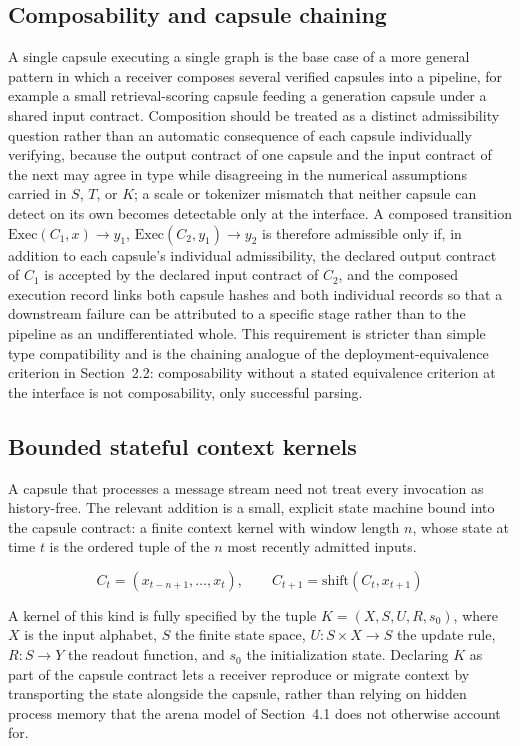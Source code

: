 \documentclass[11pt]{article}
\begin{document}
\subsection{Composability and capsule chaining}
A single capsule executing a single graph is the base case of a more general pattern in which a receiver composes several verified capsules into a pipeline, for example a small retrieval-scoring capsule feeding a generation capsule under a shared input contract. Composition should be treated as a distinct admissibility question rather than an automatic consequence of each capsule individually verifying, because the output contract of one capsule and the input contract of the next may agree in type while disagreeing in the numerical assumptions carried in $S$, $T$, or $K$; a scale or tokenizer mismatch that neither capsule can detect on its own becomes detectable only at the interface. A composed transition $\mathrm{Exec}(C_1, x) \to y_1$, $\mathrm{Exec}(C_2, y_1) \to y_2$ is therefore admissible only if, in addition to each capsule's individual admissibility, the declared output contract of $C_1$ is accepted by the declared input contract of $C_2$, and the composed execution record links both capsule hashes and both individual records so that a downstream failure can be attributed to a specific stage rather than to the pipeline as an undifferentiated whole. This requirement is stricter than simple type compatibility and is the chaining analogue of the deployment-equivalence criterion in Section~2.2: composability without a stated equivalence criterion at the interface is not composability, only successful parsing.

\subsection{Bounded stateful context kernels}
A capsule that processes a message stream need not treat every invocation as history-free. The relevant addition is a small, explicit state machine bound into the capsule contract: a finite context kernel with window length $n$, whose state at time $t$ is the ordered tuple of the $n$ most recently admitted inputs.

\[
C_t = (x_{t-n+1}, \dots, x_t), \qquad C_{t+1} = \mathrm{shift}(C_t, x_{t+1})
\]

A kernel of this kind is fully specified by the tuple $K = (X, S, U, R, s_0)$, where $X$ is the input alphabet, $S$ the finite state space, $U: S \times X \to S$ the update rule, $R: S \to Y$ the readout function, and $s_0$ the initialization state. Declaring $K$ as part of the capsule contract lets a receiver reproduce or migrate context by transporting the state alongside the capsule, rather than relying on hidden process memory that the arena model of Section~4.1 does not otherwise account for.
\end{document}
